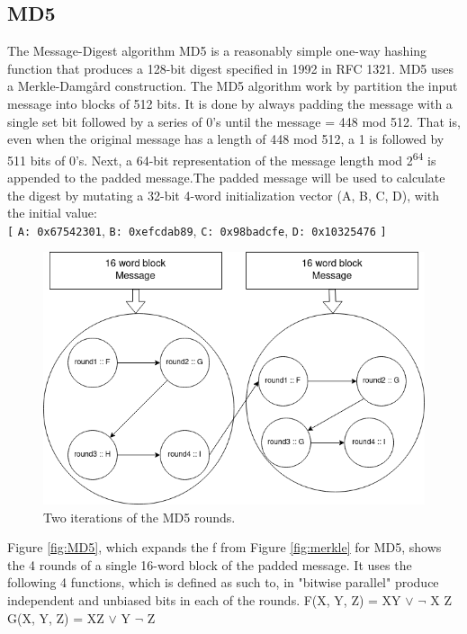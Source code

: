 \documentclass[a4paper]{article}
\begin{document}
\subsection{MD5}
\label{sec:org34d19f0}
The Message-Digest algorithm MD5 is a reasonably simple one-way hashing function that produces a 128-bit digest specified in 1992 in RFC 1321\cite{rfc1321}. MD5 uses a Merkle-Damgård construction.
The MD5 algorithm work by partition the input message into blocks of 512 bits. It is done by always padding the message with a single set bit followed by a series of 0's until the message = 448 mod 512. That is, even when the original message has a length of 448 mod 512, a 1 is followed by 511 bits of 0's.
Next, a 64-bit representation of the message length mod 2\textsuperscript{64} is appended to the padded message.The padded message will be used to calculate the digest by mutating a 32-bit 4-word initialization vector (A, B, C, D), with the initial value:\\
\texttt{[} \texttt{A: 0x67542301}, \texttt{B: 0xefcdab89}, \texttt{C: 0x98badcfe}, \texttt{D: 0x10325476} \texttt{]}\\
\begin{figure}[htbp]
\centering
\includegraphics[width=.9\linewidth]{./Background/MD5rounds.png}
\caption{\label{fig:org167d680}Two iterations of the MD5 rounds.}
\end{figure}
Figure \ref{fig:MD5}, which expands the f from Figure \ref{fig:merkle} for MD5, shows the 4 rounds of a single 16-word block of the padded message.
It uses the following 4 functions, which is defined as such to, in "bitwise parallel" produce independent and unbiased bits in each of the rounds.
F(X, Y, Z) = XY \(\vee\) \(\neg{}\) X Z\\
G(X, Y, Z) = XZ \(\vee\) Y \(\neg{}\) Z\\
\end{document}
